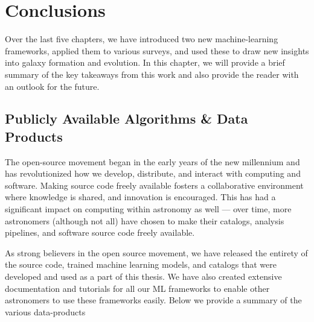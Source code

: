 \chapter{Conclusions} \label{chap:conc}

Over the last five chapters, we have introduced two new machine-learning frameworks, applied them to various surveys, and used these to draw new insights into galaxy formation and evolution. In this chapter, we will provide a brief summary of the key takeaways from this work and also provide the reader with an outlook for the future.

\section{Publicly Available Algorithms \& Data Products} \label{sec_conc:public_products}

The open-source movement began in the early years of the new millennium and has revolutionized how we develop, distribute, and interact with computing and software. Making source code freely available fosters a collaborative environment where knowledge is shared, and innovation is encouraged. This has had a significant impact on computing within astronomy as well --- over time, more astronomers (although not all) have chosen to make their catalogs, analysis pipelines, and software source code freely available. 

As strong believers in the open source movement, we have released the entirety of the source code, trained machine learning models, and catalogs that were developed and used as a part of this thesis. We have also created extensive documentation and tutorials for all our ML frameworks to enable other astronomers to use these frameworks easily. Below we provide a summary of the various data-products

